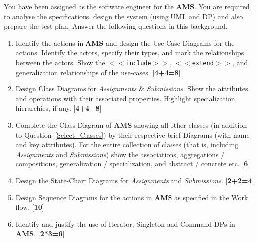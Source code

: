 \documentclass{article}
\begin{document}
\begin{enumerate}
\begin{enumerate}
\end{enumerate}

You have been assigned as the software engineer for the {\bf AMS}. You are required to analyse the specifications, design the system (using UML and DP) and also prepare the test plan. Answer the following questions in this background.

\begin{enumerate}
\item \label{Use_Cases} Identify the actions in {\bf AMS} and design the Use-Case Diagrams for the actions. Identify the actors, specify their types, and mark the relationships between the actors. Show the \texttt{$<<$include$>>$}, \texttt{$<<$extend$>>$}, and generalization relationships of the use-cases. \hfill [{\bf 4+4=8}]

\item \label{Select_Classes} Design Class Diagrams for {\em Assignments} \& {\em Submissions}. Show the attributes and  operations with their associated properties. Highlight specialization hierarchies, if any. \hfill [{\bf 4+4=8}]

\item \label{Class-Diagram} Complete the  Class Diagram of {\bf AMS} showing all other classes (in addition to Question~\ref{Select_Classes}) by  their respective brief Diagrams (with name and key attributes). For the entire collection of classes (that is, including {\em Assignments} and {\em Submissions}) show the associations, aggregations / compositions, generalization / specialization, and abstract / concrete etc. \hfill [{\bf 6}]

\item \label{State-Chart} Design the State-Chart Diagrams for {\em Assignments} and {\em Submissions}. \hfill [{\bf 2+2=4}]

\item \label{Sequence-Diagrams} Design Sequence Diagrams for the actions in {\bf AMS} as specified in the Work flow. \hfill [{\bf 10}]

\item \label{Design-Pattern} Identify and justify the use of Iterator, Singleton and Command DPs in {\bf AMS}. \hfill [{\bf 2*3=6}]


\end{enumerate}
\end{enumerate}
\end{document}

